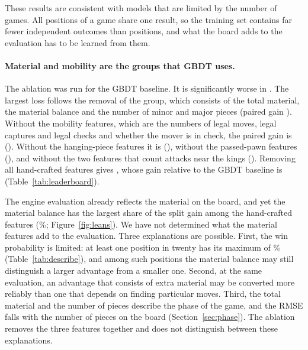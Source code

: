 \documentclass[11pt]{article}
\begin{document}
These results are consistent with models that are limited by the number of
games. All positions of a game share one result, so the training set
contains far fewer independent outcomes than positions, and what the board
adds to the evaluation has to be learned from them.
\fi



\iffeatures
\paragraph{Material and mobility are the groups that GBDT uses.}
The ablation was run for the GBDT baseline. It is significantly worse in
. The largest loss follows the removal of
the  group, which consists of the total
material, the material balance and the number of minor and major pieces
(paired gain ). Without the mobility
features, which are the numbers of legal moves, legal captures and legal
checks and whether the mover is in check, the paired gain is
(). Without the hanging-piece
features it is 
(), without the passed-pawn
features 
(), and without the two features
that count attacks near the kings 
(). Removing all hand-crafted
features gives , whose gain relative to the GBDT baseline is
 (Table~\ref{tab:leaderboard}).

The engine evaluation already reflects the material on the board, and yet
the material balance has the largest share of the split gain among the
hand-crafted features (\%;
Figure~\ref{fig:leans}). We have not determined what the material features
add to the evaluation. Three explanations are possible. First, the win
probability is limited: at least one position in twenty has its maximum of
\% (Table~\ref{tab:describe}), and among such
positions the material balance may still distinguish a larger advantage from
a smaller one. Second, at the same evaluation, an advantage that consists of
extra material may be converted more reliably than one that depends on
finding particular moves. Third, the total material and the number of pieces
describe the phase of the game\iflook, and the RMSE falls with the number of
pieces on the board (Section~\ref{sec:phase})\fi. The ablation removes the
three features together and does not distinguish between these
explanations.
\fi
\fi
\end{document}
